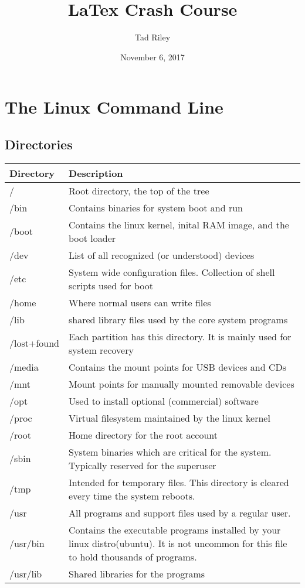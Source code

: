 \documentclass[12pt]{article}
\title{LaTex Crash Course}
\author{Tad Riley}
\date{November 6, 2017}
\begin{document}
\newpage
\section{The Linux Command Line}%
\subsection{Directories}%
\begin{tabular}{| l | p{4in} |} 
	\hline
	Directory & Description\\ \hline
	/ & Root directory, the top of the tree\\
	/bin & Contains binaries for system boot and run\\
	/boot & Contains the linux kernel, inital RAM image, and the boot loader\\
	/dev & List of all recognized (or understood) devices\\
	/etc & System wide configuration files. Collection of shell scripts used for boot\\
	/home & Where normal users can write files\\
	/lib&shared library files used by the core system programs\\
	/lost+found & Each partition has this directory. It is mainly used for system recovery\\
	/media&Contains the mount points for USB devices and CDs\\
	/mnt & Mount points for manually mounted removable devices\\
	/opt & Used to install optional (commercial) software\\
	/proc & Virtual filesystem maintained by the linux kernel\\
	/root & Home directory for the root account\\
	/sbin & System binaries which are critical for the system. Typically reserved for the superuser\\
	/tmp & Intended for temporary files. This directory is cleared every time the system reboots.\\
	/usr & All programs and support files used by a regular user.\\
	/usr/bin & Contains the executable programs installed by your linux distro(ubuntu). It is not uncommon for this file to hold thousands of programs.\\
	/usr/lib & Shared libraries for the programs\\

\end{tabular}
\end{document}

